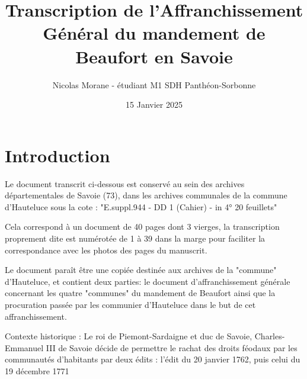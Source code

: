 \documentclass[a4paper,twoside,openany]{article}
\title{Transcription de l'Affranchissement Général du mandement de Beaufort en Savoie}
\author{Nicolas Morane - étudiant M1 SDH Panthéon-Sorbonne}
\date{15 Janvier 2025}
\begin{document}
\maketitle

\section{Introduction}

Le document transcrit ci-dessous est conservé au sein des archives départementales de Savoie (73), dans les archives communales de la commune d'Hauteluce sous la cote : "E.suppl.944 - DD 1 (Cahier) - in 4° 20 feuillets"

Cela correspond à un document de 40 pages dont 3 vierges, la transcription proprement dite est numérotée de 1 à 39 dans la marge pour faciliter la correspondance avec les photos des pages du manuscrit.

Le document paraît être une copiée destinée aux archives de la "commune" d'Hauteluce, et contient deux parties: le document d'affranchissement générale concernant les quatre "communes" du mandement de Beaufort ainsi que la procuration passée par les communier d'Hauteluce dans le but de cet affranchissement.

Contexte historique : Le roi de Piemont-Sardaigne et duc de Savoie, Charles-Emmanuel III de Savoie décide de permettre le rachat des droits féodaux par les communautés d’habitants par deux édits : l’édit du 20 janvier 1762, puis celui du 19 décembre 1771 
\end{document}
